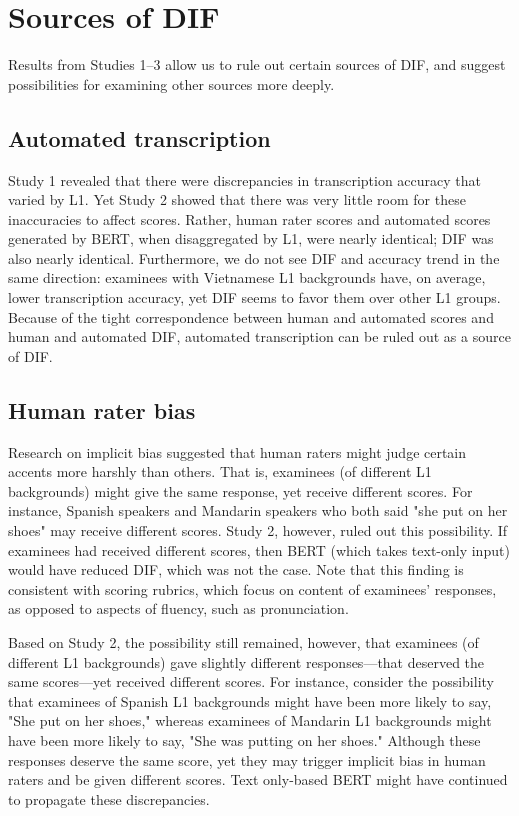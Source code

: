 \documentclass [PhD] {uclathes}
\begin{document}
\section{Sources of DIF}
\label{sec:disc_sources}

Results from Studies 1–3 allow us to rule out certain sources of DIF, and suggest possibilities for examining other sources more deeply. 

\subsection{Automated transcription}

Study 1 revealed that there were discrepancies in transcription accuracy that varied by L1. Yet Study 2 showed that there was very little room for these inaccuracies to affect scores. Rather, human rater scores and automated scores generated by BERT, when disaggregated by L1, were nearly identical; DIF was also nearly identical. Furthermore, we do not see DIF and accuracy trend in the same direction: examinees with Vietnamese L1 backgrounds have, on average, lower transcription accuracy, yet DIF seems to favor them over other L1 groups. Because of the tight correspondence between human and automated scores and human and automated DIF, automated transcription can be ruled out as a source of DIF. 

\subsection{Human rater bias}

Research on implicit bias suggested that human raters might judge certain accents more harshly than others. That is, examinees (of different L1 backgrounds) might give the same response, yet receive different scores. For instance, Spanish speakers and Mandarin speakers who both said "she put on her shoes" may receive different scores. Study 2, however, ruled out this possibility. If examinees had received different scores, then BERT (which takes text-only input) would have reduced DIF, which was not the case. Note that this finding is consistent with scoring rubrics, which focus on content of examinees’ responses, as opposed to aspects of fluency, such as pronunciation.

Based on Study 2, the possibility still remained, however, that examinees (of different L1 backgrounds) gave slightly different responses—that deserved the same scores—yet received different scores. For instance, consider the possibility that examinees of Spanish L1 backgrounds might have been more likely to say, "She put on her shoes," whereas examinees of Mandarin L1 backgrounds might have been more likely to say, "She was putting on her shoes." Although these responses deserve the same score, yet they may trigger implicit bias in human raters and be given different scores. Text only-based BERT might have continued to propagate these discrepancies. 
\end{document}
